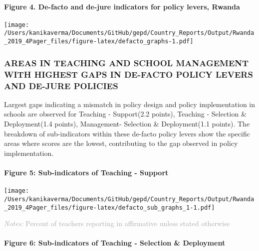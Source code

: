 \documentclass[twocolumn]{article}
\let\oldparagraph\paragraph
\renewcommand{\paragraph}[1]{\oldparagraph{#1}\mbox{}}
\begin{document}
\hypertarget{figure-4.-de-facto-and-de-jure-indicators-for-policy-levers-rwanda}{%
\paragraph{Figure 4. De-facto and de-jure indicators for policy levers,
Rwanda}\label{figure-4.-de-facto-and-de-jure-indicators-for-policy-levers-rwanda}}

\texttt{[image: /Users/kanikaverma/Documents/GitHub/gepd/Country\_Reports/Output/Rwanda\_2019\_4Pager\_files/figure-latex/defacto\_graphs-1.pdf]}

\hypertarget{areas-in-teaching-and-school-management-with-highest-gaps-in-de-facto-policy-levers-and-de-jure-policies}{%
\subsubsection{\texorpdfstring{\textbf{AREAS IN TEACHING AND SCHOOL
MANAGEMENT WITH HIGHEST GAPS IN DE-FACTO POLICY LEVERS AND DE-JURE
POLICIES}}{AREAS IN TEACHING AND SCHOOL MANAGEMENT WITH HIGHEST GAPS IN DE-FACTO POLICY LEVERS AND DE-JURE POLICIES}}\label{areas-in-teaching-and-school-management-with-highest-gaps-in-de-facto-policy-levers-and-de-jure-policies}}

Largest gaps indicating a mismatch in policy design and policy
implementation in schools are observed for Teaching - Support(2.2
points), Teaching - Selection \& Deployment(1.4 points), Management-
Selection \& Deployment(1.1 points). The breakdown of sub-indicators
within these de-facto policy levers show the specific areas where scores
are the lowest, contributing to the gap observed in policy
implementation. \vfill\null

\hypertarget{figure-5-sub-indicators-of-teaching---support}{%
\paragraph{Figure 5: Sub-indicators of Teaching -
Support}\label{figure-5-sub-indicators-of-teaching---support}}

\texttt{[image: /Users/kanikaverma/Documents/GitHub/gepd/Country\_Reports/Output/Rwanda\_2019\_4Pager\_files/figure-latex/defacto\_sub\_graphs\_1-1.pdf]}

{\scriptsize
    \textcolor{darkgray}{\textit{Notes:} Percent of teachers reporting in affirmative unless stated otherwise}
  }

\hypertarget{figure-6-sub-indicators-of-teaching---selection-deployment}{%
\paragraph{Figure 6: Sub-indicators of Teaching - Selection \&
Deployment}\label{figure-6-sub-indicators-of-teaching---selection-deployment}}
\end{document}
